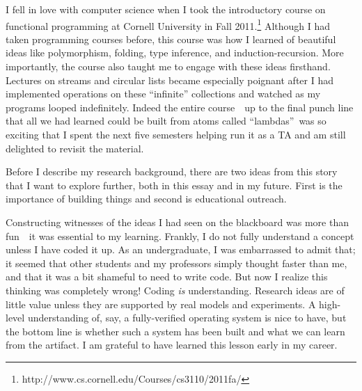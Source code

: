 \documentclass[12pt]{article}
\begin{document}
I fell in love with computer science when I took the introductory course on functional programming at Cornell University in Fall 2011.\footnote{http://www.cs.cornell.edu/Courses/cs3110/2011fa/}
Although I had taken programming courses before, this course was how I learned of beautiful ideas like polymorphism, folding, type inference, and induction-recursion.
More importantly, the course also taught me to engage with these ideas firsthand.
Lectures on streams and circular lists became especially poignant after I had implemented operations on these ``infinite'' collections and watched as my programs looped indefinitely.
Indeed the entire course~\textemdash~up to the final punch line that all we had learned could be built from atoms called ``lambdas''\textemdash~was so exciting that I spent the next five semesters helping run it as a TA and am still delighted to revisit the material.


Before I describe my research background, there are two ideas from this story that I want to explore further, both in this essay and in my future.
First is the importance of building things and second is educational outreach.

Constructing witnesses of the ideas I had seen on the blackboard was more than fun~\textemdash~it was essential to my learning.
Frankly, I do not fully understand a concept unless I have coded it up.
As an undergraduate, I was embarrassed to admit that; it seemed that other students and my professors simply thought faster than me, and that it was a bit shameful to need to write code.
But now I realize this thinking was completely wrong!
Coding \emph{is} understanding.
Research ideas are of little value unless they are supported by real models and experiments.
A high-level understanding of, say, a fully-verified operating system is nice to have, but the bottom line is whether such a system has been built and what we can learn from the artifact.
I am grateful to have learned this lesson early in my career.
\end{document}
